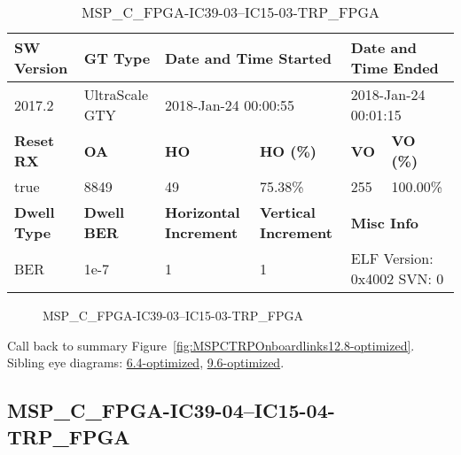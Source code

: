 \begin{table}[h]
\centering
\caption{MSP\_C\_FPGA-IC39-03--IC15-03-TRP\_FPGA}
\label{tab:MSPCFPGAIC3903IC1503TRPFPGA12.8-optimized}
\begin{tabular}{@{}|l|l|l|l|l|l|@{}}
\toprule
\textbf{SW Version}                & \textbf{GT Type}   & \multicolumn{2}{l|}{\textbf{Date and Time Started}}            & \multicolumn{2}{l|}{\textbf{Date and Time Ended}}        \\ \midrule
2017.2                       & UltraScale GTY          & \multicolumn{2}{l|}{2018-Jan-24 00:00:55}                   & \multicolumn{2}{l|}{2018-Jan-24 00:01:15}               \\ \midrule
\textbf{Reset RX}                  & \textbf{OA} & \textbf{HO}   & \textbf{HO (\%)} & \textbf{VO} & \textbf{VO (\%)} \\ \midrule
true & 8849        & 49          & 75.38\%        & 255        & 100.00\%       \\ \midrule
\textbf{Dwell Type}                & \textbf{Dwell BER} & \textbf{Horizontal Increment} & \textbf{Vertical Increment}    & \multicolumn{2}{l|}{\textbf{Misc Info}}                  \\ \midrule
BER                            & 1e-7        & 1        & 1           & \multicolumn{2}{l|}{ELF Version: 0x4002 SVN: 0}                         \\ \bottomrule
\end{tabular}
\end{table}

\begin{figure}[h]
\caption{MSP\_C\_FPGA-IC39-03--IC15-03-TRP\_FPGA} \label{fig:MSPCFPGAIC3903IC1503TRPFPGA12.8-optimized}
\end{figure}

Call back to summary Figure~\ref{fig:MSPCTRPOnboardlinks12.8-optimized}.
Sibling eye diagrams: \hyperref[sec:MSPCFPGAIC3903IC1503TRPFPGA6.4-optimized]{6.4-optimized}, \hyperref[sec:MSPCFPGAIC3903IC1503TRPFPGA9.6-optimized]{9.6-optimized}.

\clearpage
\newpage


\subsection{MSP\_C\_FPGA-IC39-04--IC15-04-TRP\_FPGA}\label{sec:MSPCFPGAIC3904IC1504TRPFPGA12.8-optimized}

